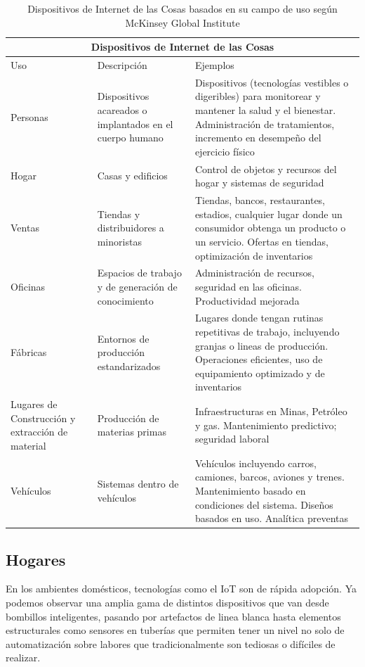 \begin{table}[ht]
\centering
\begin{tabular}{| m{3.2cm}| m{4.5cm}| m{6.6cm}|}
\hline
\multicolumn{3}{|c|}{Dispositivos de Internet de las Cosas} \\
\hline 
\centering Uso & \centering Descripción & \centering Ejemplos \tabularnewline \hline
Personas & Dispositivos acareados o implantados en el cuerpo humano & Dispositivos (tecnologías vestibles o digeribles) para monitorear y mantener la salud y el bienestar. Administración de tratamientos, incremento en desempeño del ejercicio físico \\ \hline
Hogar & Casas y edificios & Control de objetos y recursos del hogar y sistemas de seguridad\\ \hline
Ventas & Tiendas y distribuidores a minoristas & Tiendas, bancos, restaurantes, estadios, cualquier lugar donde un consumidor obtenga un producto o un servicio. Ofertas en tiendas, optimización de inventarios \\ \hline
Oficinas & Espacios de trabajo y de generación de conocimiento & Administración de recursos, seguridad en las oficinas. Productividad mejorada \\ \hline
Fábricas & Entornos de producción estandarizados & Lugares donde tengan rutinas repetitivas de trabajo, incluyendo granjas o lineas de producción. Operaciones eficientes, uso de equipamiento optimizado y de inventarios \\ \hline
Lugares de Construcción y extracción de material & Producción de materias primas & Infraestructuras en Minas, Petróleo y gas. Mantenimiento predictivo; seguridad laboral \\ \hline
Vehículos & Sistemas dentro de vehículos & Vehículos incluyendo carros, camiones, barcos, aviones y trenes. Mantenimiento basado en condiciones del sistema. Diseños basados en uso. Analítica preventas \\ \hline
\end{tabular}
\caption{Dispositivos de Internet de las Cosas basados en su campo de uso según McKinsey Global Institute}
\label{tabla:categorias_dispositivos}
\end{table}

\subsection{Hogares}
En los ambientes domésticos, tecnologías como el IoT son de rápida adopción. Ya podemos observar una amplia gama de distintos dispositivos que van desde bombillos inteligentes, pasando por artefactos de linea blanca hasta elementos estructurales como sensores en tuberías que permiten tener un nivel no solo de automatización sobre labores que tradicionalmente son tediosas o difíciles de realizar.\\

